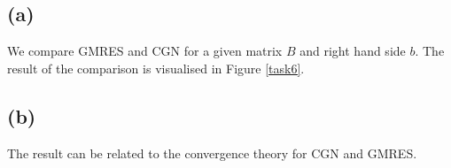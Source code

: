 \subsection{(a)}
We compare GMRES and CGN for a given matrix $B$ and right hand side $b$. The result of the comparison is visualised in Figure \ref{task6}.

\subsection{(b)}
The result can be related to the convergence theory for CGN and GMRES.
